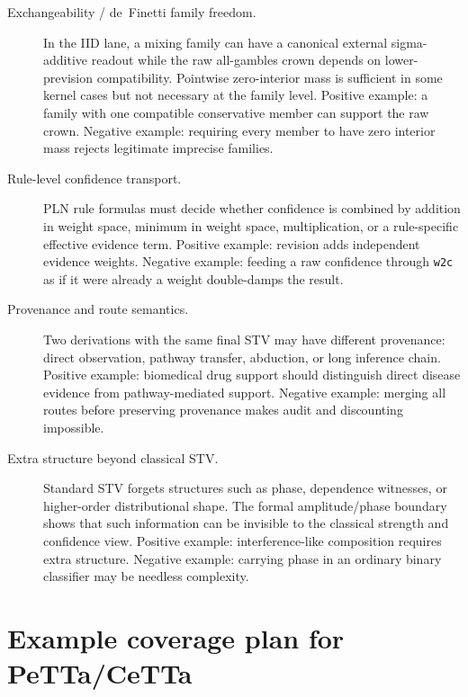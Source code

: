 \documentclass[]{article}
\newcommand{\lid}[1]{{\ttfamily\nolinkurl{#1}}}
\begin{document}
\begin{description}
\item[Exchangeability / de~Finetti family freedom.]
      In the IID lane, a mixing family can have a canonical external
      sigma-additive readout while the raw all-gambles crown depends on
      lower-prevision compatibility. Pointwise zero-interior mass is
      sufficient in some kernel cases but not necessary at the family level.
      Positive example: a family with one compatible conservative member can
      support the raw crown. Negative example: requiring every member to have
      zero interior mass rejects legitimate imprecise families.

\item[Rule-level confidence transport.]
      PLN rule formulas must decide whether confidence is combined by
      addition in weight space, minimum in weight space, multiplication, or a
      rule-specific effective evidence term. Positive example: revision adds
      independent evidence weights. Negative example: feeding a raw confidence
      through \lid{w2c} as if it were already a weight double-damps the result.

\item[Provenance and route semantics.]
      Two derivations with the same final STV may have different provenance:
      direct observation, pathway transfer, abduction, or long inference
      chain. Positive example: biomedical drug support should distinguish
      direct disease evidence from pathway-mediated support. Negative example:
      merging all routes before preserving provenance makes audit and
      discounting impossible.

\item[Extra structure beyond classical STV.]
      Standard STV forgets structures such as phase, dependence witnesses, or
      higher-order distributional shape. The formal amplitude/phase boundary
      shows that such information can be invisible to the classical strength
      and confidence view. Positive example: interference-like composition
      requires extra structure. Negative example: carrying phase in an
      ordinary binary classifier may be needless complexity.
\end{description}

\section{Example coverage plan for PeTTa/CeTTa}\label{app:examples}
\end{document}
